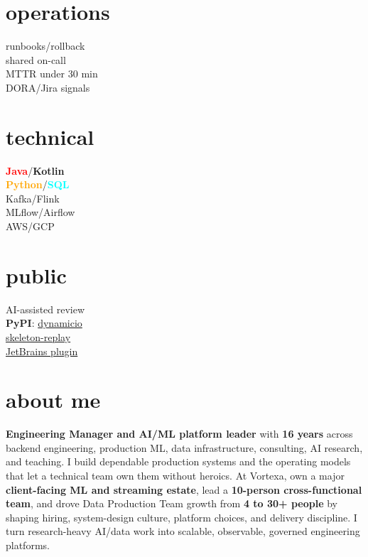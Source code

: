 \documentclass[]{../../../../friggeri-cv}
\begin{document}
\begin{aside}
    \section{operations}
        {\footnotesize runbooks/rollback\\shared on-call\\MTTR under 30 min\\DORA/Jira signals}
    \section{technical}
        {\footnotesize \textbf{\textcolor{red}{Java}}/\textbf{\textcolor{red!50!black}{Kotlin}}\\\textbf{\textcolor{orange}{Python}}/\textbf{\textcolor{cyan}{SQL}}\\Kafka/Flink\\MLflow/Airflow\\AWS/GCP}
    \section{public}
        {\footnotesize AI-assisted review\\\textbf{PyPI}: \href{https://pypi.org/project/dynamicio/}{dynamicio}\\\href{https://pypi.org/project/skeleton-replay/}{skeleton-replay}\\\href{https://plugins.jetbrains.com/plugin/32807-skeleton-replay}{JetBrains plugin}}
\end{aside}

\section{about me}
{\small \textbf{Engineering Manager and AI/ML platform leader} with \textbf{16 years} across backend engineering, production ML, data infrastructure, consulting, AI research, and teaching. I build dependable production systems and the operating models that let a technical team own them without heroics. At Vortexa, own a major \textbf{client-facing ML and streaming estate}, lead a \textbf{10-person cross-functional team}, and drove Data Production Team growth from \textbf{4 to 30+ people} by shaping hiring, system-design culture, platform choices, and delivery discipline. I turn research-heavy AI/data work into scalable, observable, governed engineering platforms.}
\end{document}

